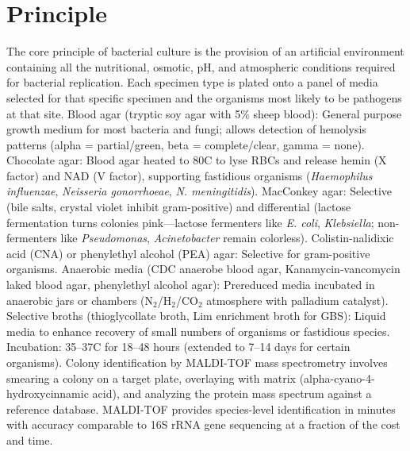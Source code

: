 \section*{Principle}
The core principle of bacterial culture is the provision of an artificial environment containing all the nutritional, osmotic, pH, and atmospheric conditions required for bacterial replication. Each specimen type is plated onto a panel of media selected for that specific specimen and the organisms most likely to be pathogens at that site. Blood agar (tryptic soy agar with 5\% sheep blood): General purpose growth medium for most bacteria and fungi; allows detection of hemolysis patterns (alpha = partial/green, beta = complete/clear, gamma = none). Chocolate agar: Blood agar heated to 80\textdegree{}C to lyse RBCs and release hemin (X factor) and NAD (V factor), supporting fastidious organisms (\textit{Haemophilus influenzae}, \textit{Neisseria gonorrhoeae}, \textit{N. meningitidis}). MacConkey agar: Selective (bile salts, crystal violet inhibit gram-positive) and differential (lactose fermentation turns colonies pink---lactose fermenters like \textit{E. coli}, \textit{Klebsiella}; non-fermenters like \textit{Pseudomonas}, \textit{Acinetobacter} remain colorless). Colistin-nalidixic acid (CNA) or phenylethyl alcohol (PEA) agar: Selective for gram-positive organisms. Anaerobic media (CDC anaerobe blood agar, Kanamycin-vancomycin laked blood agar, phenylethyl alcohol agar): Prereduced media incubated in anaerobic jars or chambers (N$_2$/H$_2$/CO$_2$ atmosphere with palladium catalyst). Selective broths (thioglycollate broth, Lim enrichment broth for GBS): Liquid media to enhance recovery of small numbers of organisms or fastidious species. Incubation: 35--37\textdegree{}C for 18--48 hours (extended to 7--14 days for certain organisms). Colony identification by MALDI-TOF mass spectrometry involves smearing a colony on a target plate, overlaying with matrix (alpha-cyano-4-hydroxycinnamic acid), and analyzing the protein mass spectrum against a reference database. MALDI-TOF provides species-level identification in minutes with accuracy comparable to 16S rRNA gene sequencing at a fraction of the cost and time.

